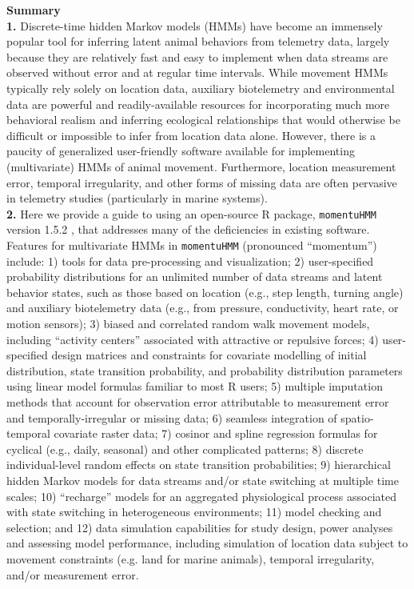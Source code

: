\documentclass[12pt]{article}\usepackage[]{graphicx}\usepackage[]{color}
\begin{document}
\noindent \textbf{Summary}\\
\textbf{1.} Discrete-time hidden Markov models (HMMs) have become an immensely popular tool for inferring latent animal behaviors from telemetry data, largely because they are relatively fast and easy to implement when data streams are observed without error and at regular time intervals. While movement HMMs typically rely solely on location data, auxiliary biotelemetry and environmental data are powerful and readily-available resources for incorporating much more behavioral realism and inferring ecological relationships that would otherwise be difficult or impossible to infer from location data alone.  However, there is a paucity of generalized user-friendly software available for implementing (multivariate) HMMs of animal movement. Furthermore, location measurement error, temporal irregularity, and other forms of missing data are often pervasive in telemetry studies (particularly in marine systems).\\ %
\textbf{2.} Here we provide a guide to using an open-source R package, \verb|momentuHMM| version 1.5.2%
, that addresses many of the deficiencies in existing software.  Features for multivariate HMMs in \verb|momentuHMM| (pronounced ``momentum'') include: 1) tools for data pre-processing and visualization; 2) user-specified probability distributions for an unlimited number of data streams and latent behavior states, such as those based on location (e.g., step length, turning angle) and auxiliary biotelemetry data (e.g., from pressure, conductivity, heart rate, or motion sensors); 3) biased and correlated random walk movement models, including ``activity centers'' associated with attractive or repulsive forces; 4) user-specified design matrices and constraints for covariate modelling of initial distribution, state transition probability, and probability distribution parameters using linear model formulas familiar to most R users; 5) multiple imputation methods that account for observation error attributable to measurement error and temporally-irregular or missing data; 6) seamless integration of spatio-temporal covariate raster data; 7) cosinor and spline regression formulas for cyclical (e.g., daily, seasonal) and other complicated patterns; 8) discrete individual-level random effects on state transition probabilities; 9) hierarchical hidden Markov models for data streams and/or state switching at multiple time scales; 10) ``recharge'' models for an aggregated physiological process associated with state switching in heterogeneous environments; 11) model checking and selection; and 12) data simulation capabilities for study design, power analyses and assessing model performance, including simulation of location data subject to movement constraints (e.g. land for marine animals), temporal irregularity, and/or measurement error.\\ 
\end{document}
